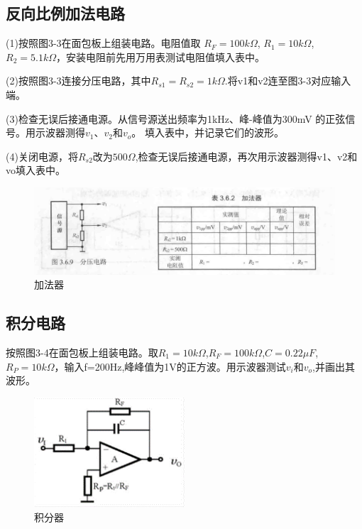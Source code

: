 \documentclass[a4paper]{article}
\theoremstyle{definition}
\theoremstyle{plain}
\theoremstyle{remark}
\begin{document}
\subsection{反向比例加法电路}

(1)按照图3-3在面包板上组装电路。电阻值取 $R_F=100k\Omega$, $R_1=10k\Omega$, $R_2= 5.1k\Omega$，安装电阻前先用万用表测试电阻值填入表中。

(2)按照图3-3连接分压电路，其中$R_{s1}=R_{s2}=1k\Omega$.将v1和v2连至图3-3对应输入端。

(3)检查无误后接通电源。从信号源送出频率为1kHz、峰-峰值为300mV 的正弦信号。用示波器测得$v_1$、$v_2$和$v_o$。 填入表中，并记录它们的波形。

(4)关闭电源，将$R_{s2}$改为$500\Omega$,检查无误后接通电源，再次用示波器测得v1、v2和vo填入表中。

\begin{figure}[H]
	\centering
	\includegraphics[width=1\textwidth]{加法器}
	\caption{加法器}
\end{figure}


\subsection{积分电路}
按照图3-4在面包板上组装电路。取$R_1=10k\Omega$,\space $R_F=100k\Omega$,$C=0.22μF$,$R_P= 10k\Omega$，输入f=200Hz,峰峰值为1V的正方波。用示波器测试$v_i$和$v_o$,并画出其波形。

\begin{figure}[H]
	\centering
	\includegraphics[width=0.5\textwidth]{积分器}
	\caption{积分器}
\end{figure}
\end{document}
